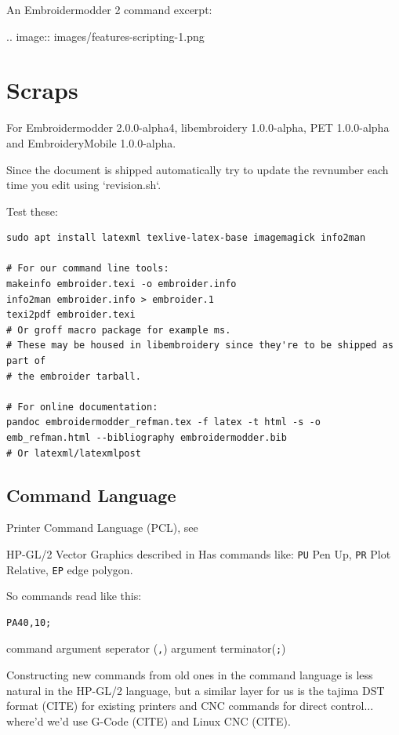 \documentclass[a4paper]{report}
\begin{document}
An Embroidermodder 2 command excerpt:

.. image::
   images/features-scripting-1.png


\section{Scraps}

For
Embroidermodder 2.0.0-alpha4, libembroidery 1.0.0-alpha, PET 1.0.0-alpha
and EmbroideryMobile 1.0.0-alpha.

Since the document is shipped automatically try to update the revnumber each
time you edit using `revision.sh`.

Test these:

\begin{lstlisting}
sudo apt install latexml texlive-latex-base imagemagick info2man

# For our command line tools:
makeinfo embroider.texi -o embroider.info
info2man embroider.info > embroider.1
texi2pdf embroider.texi
# Or groff macro package for example ms.
# These may be housed in libembroidery since they're to be shipped as part of
# the embroider tarball.

# For online documentation:
pandoc embroidermodder_refman.tex -f latex -t html -s -o emb_refman.html --bibliography embroidermodder.bib
# Or latexml/latexmlpost
\end{lstlisting}

\subsection{Command Language}

Printer Command Language (PCL), see %

HP-GL/2 Vector Graphics  described in %
Has commands like: \texttt{PU} Pen Up, \texttt{PR} Plot Relative,
\texttt{EP} edge polygon.

So commands read like this:

\begin{lstlisting}
PA40,10;
\end{lstlisting}

command argument seperator (\texttt{,}) argument terminator(\texttt{;})

Constructing new commands from old ones in the command language is less
natural in the HP-GL/2 language, but a similar layer for us is
the tajima DST format (CITE) for existing printers and CNC commands for
direct control... where'd we'd use G-Code (CITE) and Linux CNC (CITE).
\end{document}
